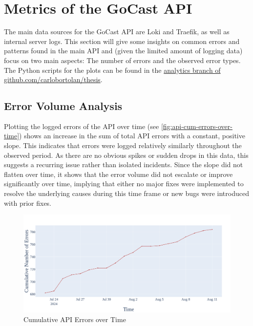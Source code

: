\section{Metrics of the GoCast API}

The main data sources for the GoCast \ac{API} are Loki and Traefik, as well as internal server logs. This section will give some insights on common errors and patterns found in the main \ac{API} and (given the limited amount of logging data) focus on two main aspects: The number of errors and the observed error types. The Python scripts for the plots can be found in the \href{https://github.com/carlobortolan/thesis/tree/analytics}{analytics branch of github.com/carlobortolan/thesis}.

\subsection{Error Volume Analysis}

Plotting the logged errors of the \ac{API} over time (see \autoref{fig:api-cum-errors-over-time}) shows an increase in the sum of total \ac{API} errors with a constant, positive slope. This indicates that errors were logged relatively similarly throughout the observed period. As there are no obvious spikes or sudden drops in this data, this suggests a recurring issue rather than isolated incidents. Since the slope did not flatten over time, it shows that the error volume did not escalate or improve significantly over time, implying that either no major fixes were implemented to resolve the underlying causes during this time frame or new bugs were introduced with prior fixes.

\begin{figure}[htpb]
    \centering
    \includegraphics[width=\linewidth]{images/plots/api/cum_errors_over_time.png}
    \caption[Cumulative \ac{API} Errors over Time]{Cumulative \ac{API} Errors over Time}\label{fig:api-cum-errors-over-time}
\end{figure}

